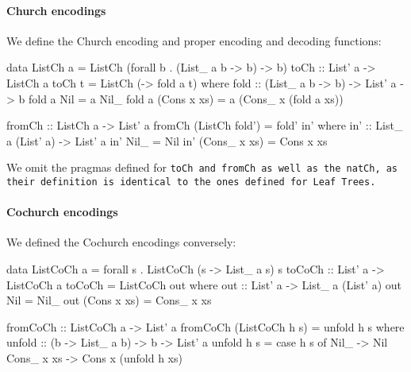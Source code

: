 \paragraph{Church encodings} We define the Church encoding and proper encoding and decoding functions:
\begin{code}
data ListCh a = ListCh (forall b . (List_ a b -> b) -> b)
toCh :: List' a -> ListCh a
toCh t = ListCh (\a -> fold a t)
  where fold :: (List_ a b -> b) -> List' a -> b
        fold a Nil         = a Nil_
        fold a (Cons x xs) = a (Cons_ x (fold a xs))

fromCh :: ListCh a -> List' a
fromCh (ListCh fold') = fold' in'
  where in' :: List_ a (List' a) -> List' a
        in' Nil_ = Nil
        in' (Cons_ x xs) = Cons x xs
\end{code}
We omit the pragmas defined for \tt{toCh} and \tt{fromCh} as well as the \tt{natCh}, as their definition is identical to the ones defined for Leaf Trees.
\paragraph{Cochurch encodings} We defined the Cochurch encodings conversely:
\begin{code}
data ListCoCh a = forall s . ListCoCh (s -> List_ a s) s
toCoCh :: List' a -> ListCoCh a
toCoCh = ListCoCh out
  where out :: List' a -> List_ a (List' a)
        out Nil = Nil_
        out (Cons x xs) = Cons_ x xs

fromCoCh :: ListCoCh a -> List' a
fromCoCh (ListCoCh h s) = unfold h s
  where unfold :: (b -> List_ a b) -> b -> List' a
        unfold h s = case h s of
          Nil_ -> Nil
          Cons_ x xs -> Cons x (unfold h xs)
\end{code}
